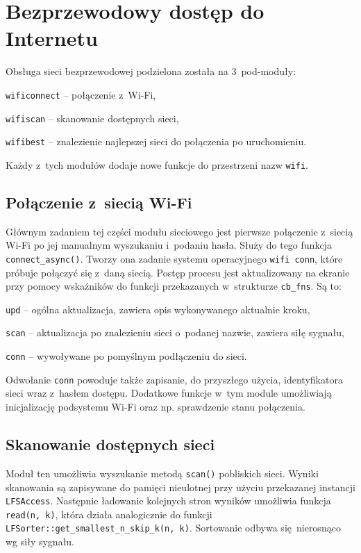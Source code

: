 \documentclass[polish]{aghengthesis}
\let\tempone\itemize
\let\temptwo\enditemize
\renewenvironment{itemize}{\tempone\setlength{\itemsep}{0cm}}{\temptwo}
\begin{document}
	\section{Bezprzewodowy dostęp do Internetu}
		Obsługa sieci bezprzewodowej podzielona została na 3~pod-moduły:
		\begin{itemize}
			\item \lstinline|wificonnect| -- połączenie z~Wi-Fi,
			\item \lstinline|wifiscan| -- skanowanie dostępnych sieci,
			\item \lstinline|wifibest| -- znalezienie najlepszej sieci do połączenia po uruchomieniu.
		\end{itemize}
		
		Każdy z~tych modułów dodaje nowe funkcje do przestrzeni nazw \lstinline|wifi|.
		
		\subsection{Połączenie z~siecią Wi-Fi}
			Głównym zadaniem tej części modułu sieciowego jest pierwsze połączenie z~siecią Wi-Fi po jej manualnym wyszukaniu i~podaniu hasła. Służy do tego funkcja \lstinline|connect_async()|. Tworzy ona zadanie systemu operacyjnego \lstinline|wifi conn|, które próbuje połączyć się z~daną siecią. Postęp procesu jest aktualizowany na ekranie przy pomocy wskaźników do funkcji przekazanych w~strukturze \lstinline|cb_fns|. Są to:
			\begin{itemize}
				\item \lstinline|upd| -- ogólna aktualizacja, zawiera opis wykonywanego aktualnie kroku,
				\item \lstinline|scan| -- aktualizacja po znalezieniu sieci o~podanej nazwie, zawiera siłę sygnału,
				\item \lstinline|conn| -- wywoływane po pomyślnym podłączeniu do sieci.
			\end{itemize}
			
			Odwołanie \lstinline|conn| powoduje także zapisanie, do przyszłego użycia, identyfikatora sieci wraz z~hasłem dostępu.
			Dodatkowe funkcje w~tym module umożliwiają inicjalizację podsystemu Wi-Fi oraz np. sprawdzenie stanu połączenia.
			
		\subsection{Skanowanie dostępnych sieci}
			Moduł ten umożliwia wyszukanie metodą \lstinline|scan()| pobliskich sieci. Wyniki skanowania są zapisywane do pamięci nieulotnej przy użyciu przekazanej instancji \lstinline|LFSAccess|. Następnie ładowanie kolejnych stron wyników umożliwia funkcja \lstinline|read(n, k)|, która działa analogicznie do funkcji \lstinline|LFSorter::get_smallest_n_skip_k(n, k)|. Sortowanie odbywa się nierosnąco wg siły sygnału.
			
\end{document}
